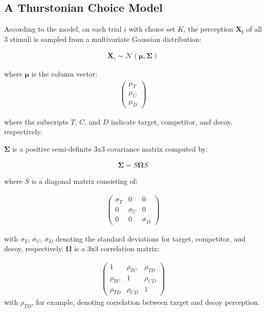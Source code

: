 \subsection{A Thurstonian Choice Model}

According to the model, on each trial $i$ with choice set $K$, the perception $\mathbf{X_i}$ of all $3$ stimuli is sampled from a multivariate Gaussian distribution:

\begin{align}
   \mathbf{X}_{i} \sim \mathcal{N}(\boldsymbol{\mu}, \boldsymbol{\Sigma})
   \label{eqn:mvnorm}
\end{align}

where $\boldsymbol{\mu}$ is the column vector:
\begin{align}
   \begin{pmatrix}
      \mu_{T} \\
      \mu_{C} \\
      \mu_{D}
      \end{pmatrix}
   \label{eqn:mu}
\end{align}

where the subscripts $T$, $C$, and $D$ indicate target, competitor, and decoy, respectively.

$\boldsymbol{\Sigma}$ is a positive semi-definite $3 \text{x} 3$ covariance matrix computed by:

\begin{align}
   \boldsymbol{\Sigma}=S\boldsymbol{\Omega}S
   \label{eqn:Sigma}
\end{align}

where $S$ is a diagonal matrix consisting of: 

\begin{align}
   \begin{pmatrix}
      \sigma_{T} & 0 & 0 \\
      0 & \sigma_{C} & 0 \\
      0 & 0 & \sigma_{D} 
   \end{pmatrix}
\label{eqn:S}
\end{align}

with $\sigma_{T}$, $\sigma_{C}$, $\sigma_{D}$ denoting the standard deviations for target, competitor, and decoy, respectively. $\boldsymbol{\Omega}$ is a $3\text{x}3$ correlation matrix:

\begin{align}
   \begin{pmatrix}
      1 & \rho_{TC} & \rho_{TD} \\
      \rho_{TC} & 1 & \rho_{CD} \\
      \rho_{TD} & \rho_{CD} & 1 
   \end{pmatrix}
\label{eqn:O}
\end{align}
with $\rho_{TD}$, for example, denoting correlation between target and decoy perception.

